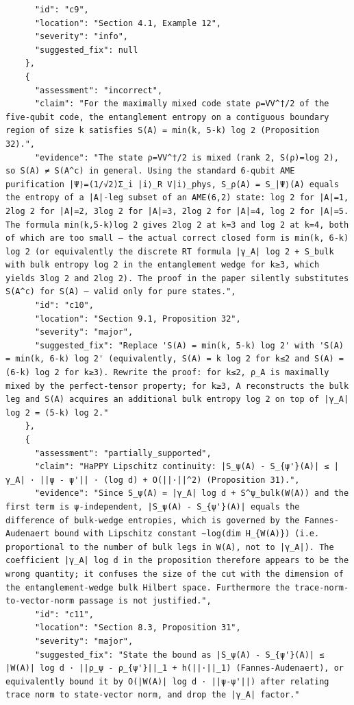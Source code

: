 \documentclass[11pt]{article}
\begin{document}
\begin{verbatim}
      "id": "c9",
      "location": "Section 4.1, Example 12",
      "severity": "info",
      "suggested_fix": null
    },
    {
      "assessment": "incorrect",
      "claim": "For the maximally mixed code state ρ=VV^†/2 of the five-qubit code, the entanglement entropy on a contiguous boundary region of size k satisfies S(A) = min(k, 5-k) log 2 (Proposition 32).",
      "evidence": "The state ρ=VV^†/2 is mixed (rank 2, S(ρ)=log 2), so S(A) ≠ S(A^c) in general. Using the standard 6-qubit AME purification |Ψ⟩=(1/√2)Σ_i |i⟩_R V|i⟩_phys, S_ρ(A) = S_|Ψ⟩(A) equals the entropy of a |A|-leg subset of an AME(6,2) state: log 2 for |A|=1, 2log 2 for |A|=2, 3log 2 for |A|=3, 2log 2 for |A|=4, log 2 for |A|=5. The formula min(k,5-k)log 2 gives 2log 2 at k=3 and log 2 at k=4, both of which are too small — the actual correct closed form is min(k, 6-k) log 2 (or equivalently the discrete RT formula |γ_A| log 2 + S_bulk with bulk entropy log 2 in the entanglement wedge for k≥3, which yields 3log 2 and 2log 2). The proof in the paper silently substitutes S(A^c) for S(A) — valid only for pure states.",
      "id": "c10",
      "location": "Section 9.1, Proposition 32",
      "severity": "major",
      "suggested_fix": "Replace 'S(A) = min(k, 5-k) log 2' with 'S(A) = min(k, 6-k) log 2' (equivalently, S(A) = k log 2 for k≤2 and S(A) = (6-k) log 2 for k≥3). Rewrite the proof: for k≤2, ρ_A is maximally mixed by the perfect-tensor property; for k≥3, A reconstructs the bulk leg and S(A) acquires an additional bulk entropy log 2 on top of |γ_A| log 2 = (5-k) log 2."
    },
    {
      "assessment": "partially_supported",
      "claim": "HaPPY Lipschitz continuity: |S_ψ(A) - S_{ψ'}(A)| ≤ |γ_A| · ||ψ - ψ'|| · (log d) + O(||·||^2) (Proposition 31).",
      "evidence": "Since S_ψ(A) = |γ_A| log d + S^ψ_bulk(W(A)) and the first term is ψ-independent, |S_ψ(A) - S_{ψ'}(A)| equals the difference of bulk-wedge entropies, which is governed by the Fannes-Audenaert bound with Lipschitz constant ~log(dim H_{W(A)}) (i.e. proportional to the number of bulk legs in W(A), not to |γ_A|). The coefficient |γ_A| log d in the proposition therefore appears to be the wrong quantity; it confuses the size of the cut with the dimension of the entanglement-wedge bulk Hilbert space. Furthermore the trace-norm-to-vector-norm passage is not justified.",
      "id": "c11",
      "location": "Section 8.3, Proposition 31",
      "severity": "major",
      "suggested_fix": "State the bound as |S_ψ(A) - S_{ψ'}(A)| ≤ |W(A)| log d · ||ρ_ψ - ρ_{ψ'}||_1 + h(||·||_1) (Fannes-Audenaert), or equivalently bound it by O(|W(A)| log d · ||ψ-ψ'||) after relating trace norm to state-vector norm, and drop the |γ_A| factor."

\end{verbatim}
\end{document}
